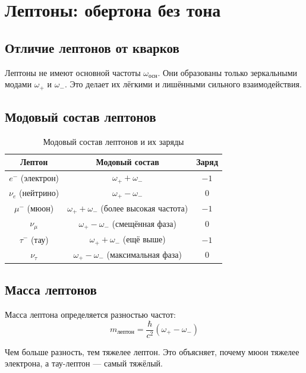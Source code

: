 \documentclass[12pt,a4paper]{article}
\begin{document}
\section{Лептоны: обертона без тона}

\subsection{Отличие лептонов от кварков}

Лептоны не имеют основной частоты \(\omega_{\text{осн}}\). Они образованы только зеркальными модами \(\omega_{+}\) и \(\omega_{-}\). Это делает их лёгкими и лишёнными сильного взаимодействия.

\subsection{Модовый состав лептонов}

\begin{table}[h]
\centering
\caption{Модовый состав лептонов и их заряды}
\begin{tabular}{c|c|c}
\toprule
\textbf{Лептон} & \textbf{Модовый состав} & \textbf{Заряд} \\
\midrule
\( e^- \) (электрон) & \( \omega_{+} + \omega_{-} \) & \( -1 \) \\
\( \nu_e \) (нейтрино) & \( \omega_{+} - \omega_{-} \) & \( 0 \) \\
\( \mu^- \) (мюон) & \( \omega_{+} + \omega_{-} \) (более высокая частота) & \( -1 \) \\
\( \nu_\mu \) & \( \omega_{+} - \omega_{-} \) (смещённая фаза) & \( 0 \) \\
\( \tau^- \) (тау) & \( \omega_{+} + \omega_{-} \) (ещё выше) & \( -1 \) \\
\( \nu_\tau \) & \( \omega_{+} - \omega_{-} \) (максимальная фаза) & \( 0 \) \\
\bottomrule
\end{tabular}
\end{table}

\subsection{Масса лептонов}

Масса лептона определяется разностью частот:
\[
m_{\text{лептон}} = \frac{\hbar}{c^2} \left( \omega_{+} - \omega_{-} \right)
\]

Чем больше разность, тем тяжелее лептон. Это объясняет, почему мюон тяжелее электрона, а тау-лептон — самый тяжёлый.
\end{document}
